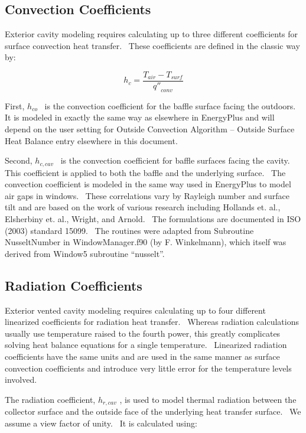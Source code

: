 {\subsection{Convection Coefficients}\label{convection-coefficients}

Exterior cavity modeling requires calculating up to three different coefficients for surface convection heat transfer.~ These coefficients are defined in the classic way by:

\begin{equation}
{h_c} = \frac{{{T_{air}} - {T_{surf}}}}{{{{q''}_{conv}}}}
\end{equation}

First, \({h_{co}}\) ~is the convection coefficient for the baffle surface facing the outdoors.~ It is modeled in exactly the same way as elsewhere in EnergyPlus and will depend on the user setting for Outside Convection Algorithm -- Outside Surface Heat Balance entry elsewhere in this document.

Second, \({h_{c,cav}}\) ~is the convection coefficient for baffle surfaces facing the cavity.~ This coefficient is applied to both the baffle and the underlying surface.~ The convection coefficient is modeled in the same way used in EnergyPlus to model air gaps in windows.~ These correlations vary by Rayleigh number and surface tilt and are based on the work of various research including Hollands et. al., Elsherbiny et. al., Wright, and Arnold.~ The formulations are documented in ISO (2003) standard 15099.~ The routines were adapted from Subroutine NusseltNumber in WindowManager.f90 (by F. Winkelmann), which itself was derived from Window5 subroutine ``nusselt''.

\subsection{Radiation Coefficients}\label{radiation-coefficients}

Exterior vented cavity modeling requires calculating up to four different linearized coefficients for radiation heat transfer.~ Whereas radiation calculations usually use temperature raised to the fourth power, this greatly complicates solving heat balance equations for a single temperature.~ Linearized radiation coefficients have the same units and are used in the same manner as surface convection coefficients and introduce very little error for the temperature levels involved.

The radiation coefficient, \({h_{r,cav}}\) , is used to model thermal radiation between the collector surface and the outside face of the underlying heat transfer surface.~ We assume a view factor of unity.~ It is calculated using:

}
